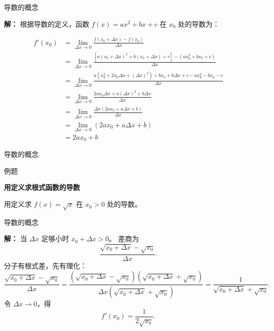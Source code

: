 \documentclass[aspectratio=169,10pt,fontset=fandol]{ctexbeamer}
\newenvironment{idea}{\par\noindent\textbf{思路}\quad}{\par\vspace{0.4em}}
\begin{document}
\begin{frame}[t,fragile]{导数的概念}
\footnotesize
{\footnotesize
\textbf{解：}
根据导数的定义，函数 $f(x) = ax^2 + bx + c$ 在 $x_0$ 处的导数为：

\begin{align*}
	f'(x_0) &= \lim_{\Delta x \to 0} \frac{f(x_0 + \Delta x) - f(x_0)}{\Delta x} \\
	&= \lim_{\Delta x \to 0} \frac{[a(x_0 + \Delta x)^2 + b(x_0 + \Delta x) + c] - (ax_0^2 + bx_0 + c)}{\Delta x} \\
	&= \lim_{\Delta x \to 0} \frac{a(x_0^2 + 2x_0\Delta x + (\Delta x)^2) + bx_0 + b\Delta x + c - ax_0^2 - bx_0 - c}{\Delta x} \\
	&= \lim_{\Delta x \to 0} \frac{2ax_0\Delta x + a(\Delta x)^2 + b\Delta x}{\Delta x} \\
	&= \lim_{\Delta x \to 0} \frac{\Delta x(2ax_0 + a\Delta x + b)}{\Delta x} \\
	&= \lim_{\Delta x \to 0} (2ax_0 + a\Delta x + b) \\
	&= 2ax_0 + b
\end{align*}

}
\end{frame}
\begin{frame}[t,fragile]{导数的概念}
\footnotesize
\begin{block}{例题}
{\footnotesize
\textbf{用定义求根式函数的导数}\par

用定义求 $f(x)=\sqrt{x}$ 在 $x_0>0$ 处的导数。

}
\end{block}
\end{frame}
\begin{frame}[t,fragile]{导数的概念}
\footnotesize
{\footnotesize
\textbf{解：}
当 $\Delta x$ 足够小时 $x_0+\Delta x>0$。 差商为
\[
\frac{\sqrt{x_0+\Delta x}-\sqrt{x_0}}{\Delta x}.
\]
分子有根式差，先有理化：
\[
\frac{\sqrt{x_0+\Delta x}-\sqrt{x_0}}{\Delta x}
=\frac{(\sqrt{x_0+\Delta x}-\sqrt{x_0})(\sqrt{x_0+\Delta x}+\sqrt{x_0})}{\Delta x(\sqrt{x_0+\Delta x}+\sqrt{x_0})}
=\frac1{\sqrt{x_0+\Delta x}+\sqrt{x_0}}.
\]
令 $\Delta x\to0$，得
\[
f'(x_0)=\frac1{2\sqrt{x_0}}.
\]

}
\end{frame}
\end{document}
